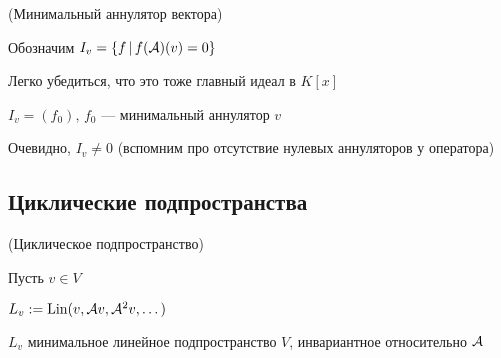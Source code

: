 \begin{conj}(Минимальный аннулятор вектора)

    Обозначим $I_v = \{ f \, | \, f(\mathcal{A}) (v) = 0 \}$ 

    Легко убедиться, что это тоже главный идеал в $K[x]$

    $I_v = (f_0), \, f_0$ --- минимальный аннулятор $v$

    Очевидно, $I_v \neq 0$ (вспомним про отсутствие нулевых аннуляторов у оператора)
\end{conj}

\vspace*{5mm}
\subsection{Циклические подпространства}

\begin{conj}(Циклическое подпространство)

    Пусть $ v \in V  $

    $ L_v := \operatorname{Lin} (v, \mathcal{A} v, \mathcal{A}^2 v, \dots ) $

    $ L_v $  минимальное линейное подпространство $V$, инвариантное относительно $\mathcal{A}$

\end{conj}


